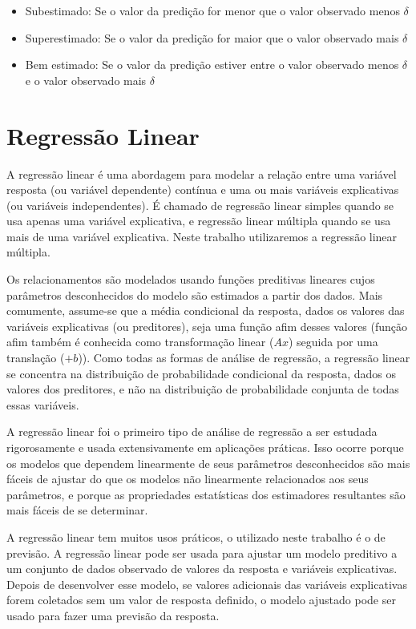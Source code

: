 \begin{itemize}
	\item Subestimado: Se o valor da predição for menor que o valor observado menos $ \delta $
	\item Superestimado: Se o valor da predição for maior que o valor observado mais $ \delta $
	\item Bem estimado: Se o valor da predição estiver entre o valor observado menos $ \delta $ e o valor observado mais $ \delta $
\end{itemize}

\section{Regressão Linear}
\label{sec:regressao_linear}

A regressão linear é uma abordagem para modelar a relação entre uma variável resposta (ou variável dependente) contínua e uma ou mais variáveis ​​explicativas (ou variáveis ​​independentes). É chamado de regressão linear simples quando se usa apenas uma variável explicativa, e regressão linear múltipla quando se usa mais de uma variável explicativa. Neste trabalho utilizaremos a regressão linear múltipla.

Os relacionamentos são modelados usando funções preditivas lineares cujos parâmetros desconhecidos do modelo são estimados a partir dos dados. Mais comumente, assume-se que a média condicional da resposta, dados os valores das variáveis ​​explicativas (ou preditores), seja uma função afim desses valores (função afim também é conhecida como transformação linear ($ Ax $) seguida por uma translação ($ +b $)). Como todas as formas de análise de regressão, a regressão linear se concentra na distribuição de probabilidade condicional da resposta, dados os valores dos preditores, e não na distribuição de probabilidade conjunta de todas essas variáveis.

A regressão linear foi o primeiro tipo de análise de regressão a ser estudada rigorosamente e usada extensivamente em aplicações práticas. Isso ocorre porque os modelos que dependem linearmente de seus parâmetros desconhecidos são mais fáceis de ajustar do que os modelos não linearmente relacionados aos seus parâmetros, e porque as propriedades estatísticas dos estimadores resultantes são mais fáceis de se determinar.

A regressão linear tem muitos usos práticos, o utilizado neste trabalho é o de previsão. A regressão linear pode ser usada para ajustar um modelo preditivo a um conjunto de dados observado de valores da resposta e variáveis ​​explicativas. Depois de desenvolver esse modelo, se valores adicionais das variáveis ​​explicativas forem coletados sem um valor de resposta definido, o modelo ajustado pode ser usado para fazer uma previsão da resposta.

